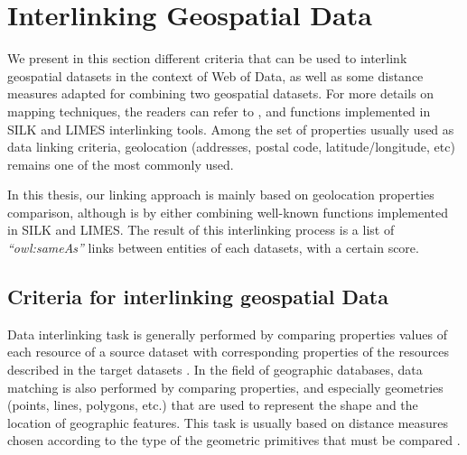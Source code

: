 \section{Interlinking Geospatial Data}
\label{sec:interlinking}

We present in this section different criteria that can be used to interlink geospatial datasets in the context of Web of Data, as well as some distance measures adapted for combining two geospatial datasets. For more details on mapping techniques, the readers can refer to \cite{euzenat2007}, and functions implemented in SILK \cite{jentzsch2010silk,isele2011} and LIMES \cite{ngau11} interlinking tools. Among the set of properties usually used as data linking criteria, geolocation (addresses, postal code, latitude/longitude, etc) remains one of the most commonly used.

In this thesis, our linking approach is mainly based on geolocation properties comparison, although is by either combining well-known functions implemented in SILK and LIMES. The result of this interlinking process is a list of \textit{``owl:sameAs''} links between entities of each datasets, with a certain score.

\subsection{Criteria for interlinking geospatial Data}
Data interlinking task is generally performed by comparing properties values of each resource of a source dataset with corresponding properties of the resources described in the target datasets \cite{scharffe2010}. In the field of geographic databases, data matching is also performed by comparing properties, and especially geometries (points, lines, polygons, etc.) that are used to represent the shape and the location of geographic features. This task is usually based on distance measures chosen according to the type of the geometric primitives that must be compared \cite{mustiere2008,anamaria08,Julius09,walter1999}.


